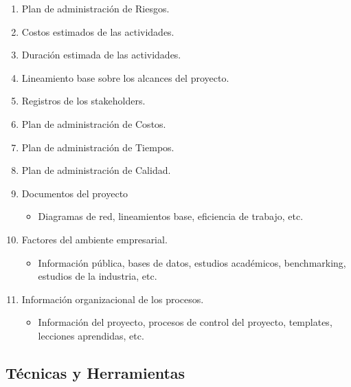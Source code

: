 \begin{enumerate}
    \item Plan de administración de Riesgos.
    \item Costos estimados de las actividades.
    \item Duración estimada de las actividades.
    \item Lineamiento base sobre los alcances del proyecto.
    \item Registros de los stakeholders.
    \item Plan de administración de Costos.
    \item Plan de administración de Tiempos.
    \item Plan de administración de Calidad.
    \item Documentos del proyecto
    \begin{itemize}
        \item Diagramas de red, lineamientos base, eficiencia de trabajo, etc.
    \end{itemize}
    \item Factores del ambiente empresarial.
    \begin{itemize}
        \item Información pública, bases de datos, estudios académicos,
        benchmarking, estudios de la industria, etc.
   
    \end{itemize}
    \item Información organizacional de los procesos.
    \begin{itemize}
        \item Información del proyecto, procesos de control del proyecto,
        templates, lecciones aprendidas, etc.
    \end{itemize}

\end{enumerate}


\subsection{Técnicas y Herramientas}

